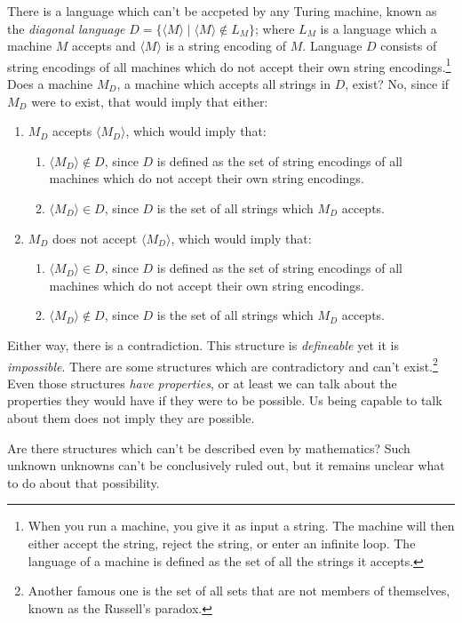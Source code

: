 There is a language which can't be accpeted by any Turing machine, known as the \textit{diagonal language} $D = \{\langle M \rangle \mid \langle M \rangle \notin L_M \}$; where $L_M$ is a language which a machine $M$ accepts and $\langle M \rangle$ is a string encoding of $M$.
Language $D$ consists of string encodings of all machines which do not accept their own string encodings.\footnote
{
When you run a machine, you give it as input a string.
The machine will then either accept the string, reject the string, or enter an infinite loop.
The language of a machine is defined as the set of all the strings it accepts.
}
Does a machine $M_D$, a machine which accepts all strings in $D$, exist?
No, since if $M_D$ were to exist, that would imply that either:
\begin{enumerate}
\item $M_D$ accepts $\langle M_D \rangle$, which would imply that:
\begin{enumerate}
\item $\langle M_D \rangle \notin D$, since $D$ is defined as the set of string encodings of all machines which do not accept their own string encodings.
\item $\langle M_D \rangle \in D$, since $D$ is the set of all strings which $M_D$ accepts.
\end{enumerate}
\item $M_D$ does not accept $\langle M_D \rangle$, which would imply that:
\begin{enumerate}
\item $\langle M_D \rangle \in D$, since $D$ is defined as the set of string encodings of all machines which do not accept their own string encodings.
\item $\langle M_D \rangle \notin D$, since $D$ is the set of all strings which $M_D$ accepts.
\end{enumerate}
\end{enumerate}
Either way, there is a contradiction. This structure is \textit{defineable} yet it is \textit{impossible}.
There are some structures which are contradictory and can't exist.\footnote{Another famous one is the set of all sets that are not members of themselves, known as the Russell's paradox.}
Even those structures \textit{have properties}, or at least we can talk about the properties they would have if they were to be possible.
Us being capable to talk about them does not imply they are possible.

Are there structures which can't be described even by mathematics?
Such unknown unknowns can't be conclusively ruled out, but it remains unclear what to do about that possibility.

